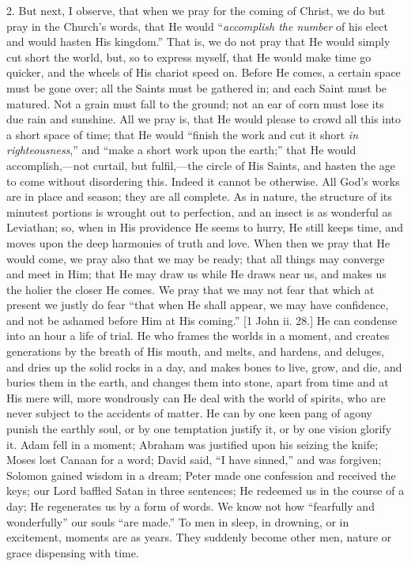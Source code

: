 2. But next, I observe, that when we pray for the coming of Christ,
we do but pray in the Church's words, that He would ``\emph{accomplish
the number} of his elect and would hasten His kingdom.'' That
is, we do not pray that He would simply cut short the world, but, so
to express myself, that He would make time go quicker, and the wheels
of His chariot speed on. Before He comes, a certain space must be gone
over; all the Saints must be gathered in; and each Saint must be
matured. Not a grain must fall to the ground; not an ear of corn must
lose its due rain and sunshine. All we pray is, that He would please
to crowd all this into a short space of time; that He would
``finish the work and cut it short \emph{in righteousness},''
and ``make a short work upon the earth;'' that He would
accomplish,—not curtail, but fulfil,—the circle of His Saints, and
hasten the age to come without disordering this. Indeed it cannot be
otherwise. All God's works are in place and season; they are all
complete. As in nature, the structure of its minutest portions is
wrought out to perfection, and an insect is as wonderful as Leviathan;
so, when in His providence He seems to hurry, He still keeps time, and
moves upon the deep harmonies of truth and love. When then we pray
that He would come, we pray also that we may be ready; that all things
may converge and meet in Him; that He may draw us while He draws near
us, and makes us the holier the closer He comes. We pray that we may
not fear that which at present we justly do fear ``that when He
shall appear, we may have confidence, and not be ashamed before Him at
His coming.'' [1 John ii. 28.] He can condense into an hour a life
of trial. He who frames the worlds in a moment, and creates
generations by the breath of His mouth, and melts, and hardens, and
deluges, and dries up the solid rocks in a day, and makes bones to
live, grow, and die, and buries them in the earth, and changes them
into stone, apart from time and at His mere will, more wondrously can
He deal with the world of spirits, who are never subject to the
accidents of matter. He can by one keen pang of agony punish the
earthly soul, or by one temptation justify it, or by one vision
glorify it. Adam fell in a moment; Abraham was justified upon his
seizing the knife; Moses lost Canaan for a word; David said, ``I have
sinned,'' and was forgiven; Solomon gained wisdom in a dream;
Peter made one confession and received the keys; our Lord baffled
Satan in three sentences; He redeemed us in the course of a day; He
regenerates us by a form of words. We know not how ``fearfully and
wonderfully'' our souls ``are made.'' To men in sleep, in
drowning, or in excitement, moments are as years. They suddenly become
other men, nature or grace dispensing with time.

